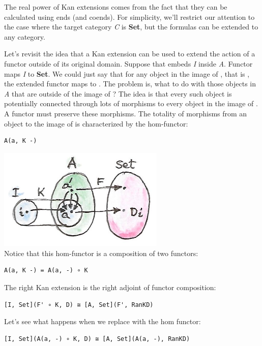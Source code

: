The real power of Kan extensions comes from the fact that they can be
calculated using ends (and coends). For simplicity, we'll restrict our
attention to the case where the target category \emph{C} is
\textbf{Set}, but the formulas can be extended to any category.

Let's revisit the idea that a Kan extension can be used to extend the
action of a functor outside of its original domain. Suppose that
 embeds \emph{I} inside \emph{A}. Functor  maps
\emph{I} to \textbf{Set}. We could just say that for any object
 in the image of , that is , the
extended functor maps  to . The problem is, what
to do with those objects in \emph{A} that are outside of the image of
? The idea is that every such object is potentially connected
through lots of morphisms to every object in the image of . A
functor must preserve these morphisms. The totality of morphisms from an
object  to the image of  is characterized by the
hom-functor:

\begin{verbatim}
A(a, K -)
\end{verbatim}

\includegraphics[width=3.12500in]{images/kan13.jpg}\\
Notice that this hom-functor is a composition of two functors:

\begin{verbatim}
A(a, K -) = A(a, -) ∘ K
\end{verbatim}

The right Kan extension is the right adjoint of functor composition:

\begin{verbatim}
[I, Set](F' ∘ K, D) ≅ [A, Set](F', RanKD)
\end{verbatim}

Let's see what happens when we replace  with the hom
functor:

\begin{verbatim}
[I, Set](A(a, -) ∘ K, D) ≅ [A, Set](A(a, -), RanKD)
\end{verbatim}

